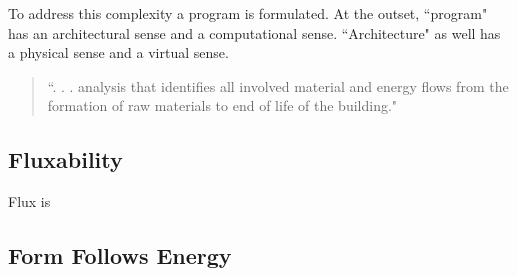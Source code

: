 To address this complexity a program is formulated. At the outset, ``program" has an architectural sense and a computational sense. ``Architecture" as well has a physical sense and a virtual sense.







\begin{quote}
  ``. . . analysis that identifies all involved material and energy flows from the formation of raw materials to end of life of the building." \cite[p. 70]{MOEHEA}
\end{quote}

\subsection{Fluxability}
Flux is





\subsection{Form Follows Energy}






